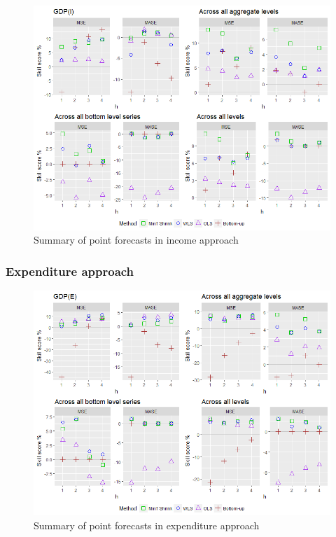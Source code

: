 \documentclass[graybox]{svmult}
\begin{document}
\begin{figure}[H]
	\centering
	\small
	\includegraphics[scale=0.50]{Figs/Results/INC-PointF.png}
	\caption{Summary of point forecasts in income approach}\label{Exp-PointF}
\end{figure}


\subsubsection*{Expenditure approach}

\begin{figure}[H]
	\centering
	\small
	\includegraphics[scale=0.50]{Figs/Results/EXP-PointF.png}
	\caption{Summary of point forecasts in expenditure approach}\label{Inc-PointF}
\end{figure}
\end{document}

